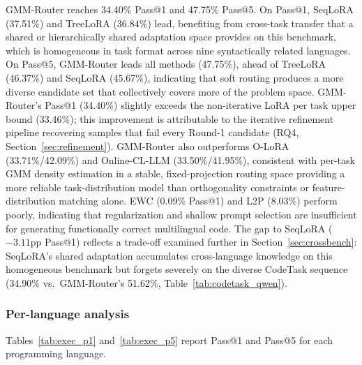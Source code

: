 GMM-Router reaches 34.40\% Pass@1 and 47.75\% Pass@5. On Pass@1, SeqLoRA (37.51\%) and TreeLoRA (36.84\%) lead, benefiting from cross-task transfer that a shared or hierarchically shared adaptation space provides on this benchmark, which is homogeneous in task format across nine syntactically related languages. On Pass@5, GMM-Router leads all methods (47.75\%), ahead of TreeLoRA (46.37\%) and SeqLoRA (45.67\%), indicating that soft routing produces a more diverse candidate set that collectively covers more of the problem space. GMM-Router's Pass@1 (34.40\%) slightly exceeds the non-iterative LoRA per task upper bound (33.46\%); this improvement is attributable to the iterative refinement pipeline recovering samples that fail every Round-1 candidate (RQ4, Section~\ref{sec:refinement}). GMM-Router also outperforms O-LoRA (33.71\%/42.09\%) and Online-CL-LLM (33.50\%/41.95\%), consistent with per-task GMM density estimation in a stable, fixed-projection routing space providing a more reliable task-distribution model than orthogonality constraints or feature-distribution matching alone. EWC (0.09\% Pass@1) and L2P (8.03\%) perform poorly, indicating that regularization and shallow prompt selection are insufficient for generating functionally correct multilingual code. The gap to SeqLoRA ($-3.11$pp Pass@1) reflects a trade-off examined further in Section~\ref{sec:crossbench}: SeqLoRA's shared adaptation accumulates cross-language knowledge on this homogeneous benchmark but forgets severely on the diverse CodeTask sequence (34.90\% vs.\ GMM-Router's 51.62\%, Table~\ref{tab:codetask_qwen}).

\subsubsection{Per-language analysis}
\label{sec:perlang}

Tables~\ref{tab:exec_p1} and~\ref{tab:exec_p5} report Pass@1 and Pass@5 for each programming language.

